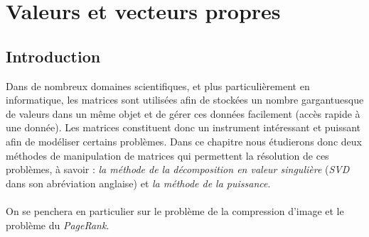 \documentclass[a4paper,10pt]{report}
\begin{document}
\chapter{Valeurs et vecteurs propres}
\section{Introduction}
Dans de nombreux domaines scientifiques, et plus particulièrement en informatique, les matrices sont utilisées afin de stockées un nombre gargantuesque de valeurs dans un même objet et de gérer ces données facilement (accès rapide à une donnée). Les matrices constituent donc un instrument intéressant et puissant afin de modéliser certains problèmes. Dans ce chapitre nous étudierons donc deux méthodes de manipulation de matrices qui permettent la résolution de ces problèmes, à savoir : \textit{la méthode de la décomposition en valeur singulière} (\textit{SVD} dans son abréviation anglaise) et \textit{la méthode de la puissance}. \\ \\

\indent On se penchera en particulier sur le problème de la compression d'image et le problème du \textit{PageRank}. \\
\end{document}

